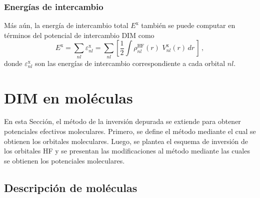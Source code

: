 \subsubsection*{Energías de intercambio}

Más aún, la energía de intercambio total $E^{\mathrm{x}}$ también se 
puede computar en términos del potencial de intercambio DIM como
\begin{equation}
E^{\mathrm{x}} = \sum_{nl}\varepsilon_{nl}^{\mathrm{x}} = 
\sum_{nl}\left[\frac{1}{2}\int{\rho^{\mathrm{HF}}_{nl}(r) \, \, 
V_{nl}^{\mathrm{x}}}(r) \, dr \, \right]\,,
\label{eq:exchange-energy}
\end{equation}
donde $\varepsilon_{nl}^{\mathrm{x}}$ son las energías de intercambio 
correspondiente a cada orbital $nl$.


\section{DIM en moléculas}
\label{sec:dimmoleculas}

En esta Sección, el método de la inversión depurada se extiende para 
obtener potenciales efectivos moleculares. Primero, se define el método 
mediante el cual se obtienen los orbitales moleculares. Luego, se 
plantea el esquema de inversión de los orbitales HF y se presentan las 
modificaciones al método mediante las cuales se obtienen los potenciales 
moleculares.

\subsection{Descripción de moléculas}
\label{sec:moleculas}

